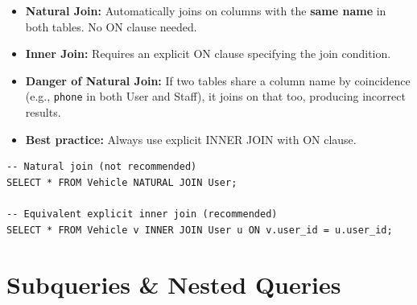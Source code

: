 \documentclass[12pt,a4paper]{article}
\begin{document}
\begin{questionbox}
\end{questionbox}
\begin{answerbox}
\begin{itemize}[nosep]
    \item \textbf{Natural Join:} Automatically joins on columns with the \textbf{same name} in both tables. No ON clause needed.
    \item \textbf{Inner Join:} Requires an explicit ON clause specifying the join condition.
    \item \textbf{Danger of Natural Join:} If two tables share a column name by coincidence (e.g., \texttt{phone} in both User and Staff), it joins on that too, producing incorrect results.
    \item \textbf{Best practice:} Always use explicit INNER JOIN with ON clause.
\end{itemize}
\begin{lstlisting}
-- Natural join (not recommended)
SELECT * FROM Vehicle NATURAL JOIN User;

-- Equivalent explicit inner join (recommended)
SELECT * FROM Vehicle v INNER JOIN User u ON v.user_id = u.user_id;
\end{lstlisting}
\end{answerbox}

\section{Subqueries \& Nested Queries}
\end{document}
